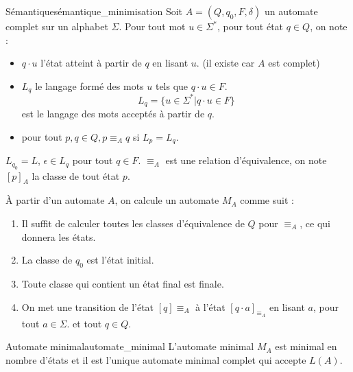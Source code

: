 \begin{definition}{Sémantique}{sémantique_minimisation}
    Soit $A=(Q,q_0,F,\delta)$ un automate complet sur un alphabet $\Sigma$. Pour tout mot $u\in\Sigma^*$, pour tout état $q\in
    Q$, on note :
    \begin{itemize}[label=\textbullet]
        \item $q\cdot u$ l'état atteint à partir de $q$ en lisant $u$. (il existe car $A$ est complet)
        \item $L_q$ le langage formé des mots $u$ tels que $q\cdot u\in F$.
        \begin{equation*}
            L_q = \{u\in\Sigma^* | q\cdot u\in F\}
        \end{equation*}
        est le langage des mots acceptés à partir de $q$.
        \item pour tout $p,q\in Q, p\equiv_A q$ si $L_p = L_q$.
    \end{itemize}
\end{definition}
\begin{remark}
    $L_{q_0} = L$, $\epsilon\in L_q$ pour tout $q\in F$. $\equiv_A$ est une relation d'équivalence, on note $[p]_A$ la classe
    de tout état $p$.
\end{remark}
\noindent À partir d'un automate $A$, on calcule un automate $M_A$ comme suit :
\begin{enumerate}
    \item Il suffit de calculer toutes les classes d'équivalence de $Q$ pour $\equiv_A$, ce qui donnera les états.
    \item La classe de $q_0$ est l'état initial.
    \item Toute classe qui contient un état final est finale.
    \item On met une transition de l'état $[q]\equiv_A$ à l'état $[q\cdot a]_{\equiv_A}$ en lisant $a$, pour tout $a\in\Sigma$.
    et tout $q\in Q$.
\end{enumerate}
\begin{theorem}{Automate minimal}{automate_minimal}
    L'automate minimal $M_A$ est minimal en nombre d'états et il est l'unique automate minimal complet qui accepte $L(A)$.
\end{theorem}
